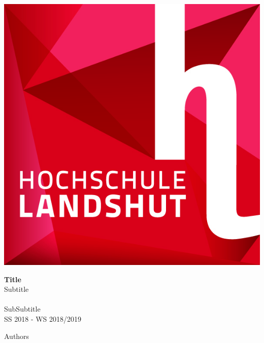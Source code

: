 \begin{titlepage}


\begin{center}
 		\includegraphics[scale=1]{Resources/Haw}
\end{center}

\begin{center}
	\HUGE \textbf{Title}
	\large\\Subtitle\\ \ \\
	\small SubSubtitle \\
	SS 2018 - WS 2018/2019
\end{center}

\begin{center}
Authors
\end{center}

\end{titlepage}
